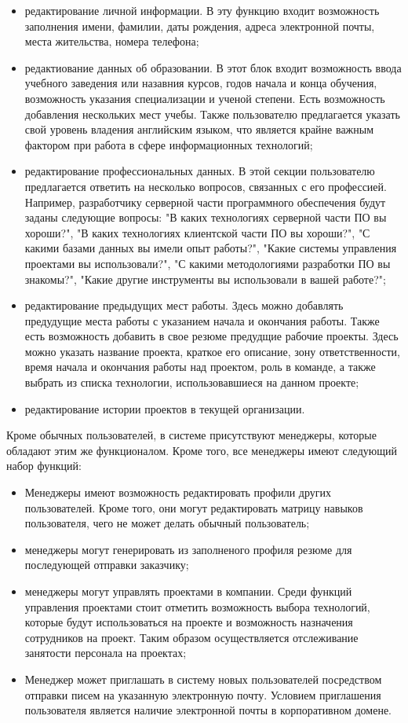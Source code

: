 \begin{itemize}
	\item редактирование личной информации. В эту функцию входит возможность заполнения имени, фамилии, даты рождения,
	адреса электронной почты, места жительства, номера телефона;
  \item редактиование данных об образовании. В этот блок входит возможность ввода учебного заведения или назавния курсов,
  годов начала и конца обучения, возможность указания специализации и ученой степени. Есть возможность добавления
  нескольких мест учебы. Также пользователю предлагается указать свой уровень владения английским языком, что
  является крайне важным фактором при работа в сфере информационных технологий;
	\item редактирование профессиональных данных. В этой секции пользователю предлагается ответить на несколько вопросов,
  связанных с его профессией. Например, разработчику серверной части программного обеспечения будут заданы следующие
  вопросы: "В каких технологиях серверной части ПО вы хороши?", "В каких технологиях клиентской части ПО вы хороши?",
  "С какими базами данных вы имели опыт работы?", "Какие системы управления проектами вы использовали?",
  "С какими методологиями разработки ПО вы знакомы?", "Какие другие инструменты вы использовали в вашей работе?";
	\item редактирование предыдущих мест работы. Здесь можно добавлять предудущие места работы с указанием начала и
  окончания работы. Также есть возможность добавить в свое резюме предудщие рабочие проекты. Здесь можно указать название
  проекта, краткое его описание, зону ответственности, время начала и окончания работы над проектом, роль в команде, 
  а также выбрать из списка технологии, использовавшиеся на данном проекте;
	\item редактирование истории проектов в текущей организации.
\end{itemize}

Кроме обычных пользователей, в системе присутствуют менеджеры, которые обладают этим же функционалом. Кроме того,
все менеджеры имеют следующий набор функций:
\begin{itemize}
	\item Менеджеры имеют возможность редактировать профили других пользователей. Кроме того, они могут редактировать
  матрицу навыков пользователя, чего не может делать обычный пользователь;
  \item менеджеры могут генерировать из заполненого профиля резюме для последующей отправки заказчику;
  \item менеджеры могут управлять проектами в компании. Среди функций управления проектами стоит отметить возможность
  выбора технологий, которые будут использоваться на проекте и возможность назначения сотрудников на проект. Таким образом
  осуществляется отслеживание занятости персонала на проектах;
  \item Менеджер может приглашать в систему новых пользователей посредством отправки писем на указанную электронную
  почту. Условием приглашения пользователя является наличие электронной почты в корпоративном домене.
\end{itemize}

